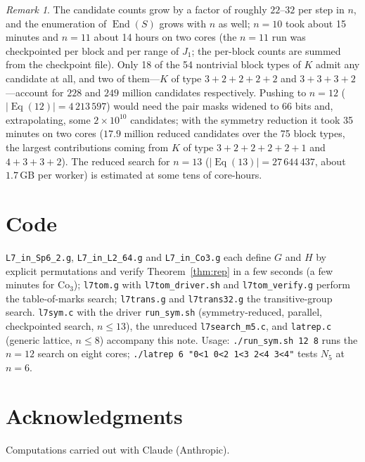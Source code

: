 \documentclass[11pt]{article}
\theoremstyle{remark}
\newtheorem{remark}[theorem]{Remark}
\newcommand{\Eq}{\operatorname{Eq}}
\newcommand{\End}{\operatorname{End}}
\begin{document}
\begin{remark}
The candidate counts grow by a factor of roughly $22$--$32$ per step in $n$, and the enumeration of
$\End(S)$ grows with $n$ as well; $n=10$ took about 15 minutes and $n=11$ about 14 hours on two
cores (the $n=11$ run was checkpointed per block and per range of $J_1$; the per-block counts are
summed from the checkpoint file). Only 18 of the 54 nontrivial block types of $K$ admit any
candidate at all, and two of them---$K$ of type $3+2+2+2+2$ and $3+3+3+2$---account for
$228$ and $249$ million candidates respectively. Pushing to $n=12$ ($|\Eq(12)|=4\,213\,597$)
would need the pair masks widened to 66 bits and, extrapolating, some $2\times 10^{10}$ candidates;
with the symmetry reduction it took 35 minutes on two cores ($17.9$ million reduced candidates
over the 75 block types, the largest contributions coming from $K$ of type $3+2+2+2+2+1$ and $4+3+3+2$).
The reduced search for $n=13$ ($|\Eq(13)|=27\,644\,437$, about $1.7$\,GB per worker) is estimated
at some tens of core-hours.
\end{remark}

\section*{Code}

\texttt{L7\_in\_Sp6\_2.g}, \texttt{L7\_in\_L2\_64.g} and \texttt{L7\_in\_Co3.g} each define $G$ and $H$
by explicit permutations and verify Theorem~\ref{thm:rep} in a few seconds (a few minutes for
$\mathrm{Co}_3$); \texttt{l7tom.g} with \texttt{l7tom\_driver.sh} and \texttt{l7tom\_verify.g} perform
the table-of-marks search; \texttt{l7trans.g} and \texttt{l7trans32.g} the transitive-group search.
\texttt{l7sym.c} with the driver \texttt{run\_sym.sh} (symmetry-reduced, parallel, checkpointed search,
$n\le 13$), the unreduced \texttt{l7search\_m5.c}, and \texttt{latrep.c} (generic lattice, $n\le 8$)
accompany this note. Usage: \texttt{./run\_sym.sh 12 8} runs the $n=12$ search on eight cores; \texttt{./latrep 6 "0<1 0<2 1<3 2<4 3<4"} tests $N_5$ at $n=6$.

\section*{Acknowledgments}
	Computations carried out with Claude (Anthropic).
\end{document}
